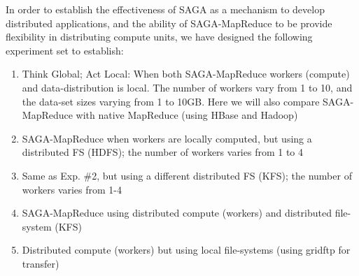 \documentclass[conference,final]{IEEEtran}
\newcommand{\jhanote}[1]{ {\textcolor{red} { ***SJ: #1 }}}
\newcommand{\jhanote}[1]{}
\newcommand{\sagamapreduce }{SAGA-MapReduce }
\begin{document}




In order to establish the effectiveness of SAGA as a mechanism to
develop distributed applications, and the ability of \sagamapreduce to
be provide flexibility in distributing compute units, we have designed
the following experiment set to establish:
\begin{enumerate}
\item Think Global; Act Local: When both \sagamapreduce workers
  (compute) and data-distribution is local. The number of workers vary
  from 1 to 10, and the data-set sizes varying from 1 to 10GB. Here we
  will also compare \sagamapreduce with native MapReduce (using HBase
  and Hadoop)
\item \sagamapreduce when workers are locally computed, but using a distributed FS (HDFS); the number of workers varies from 1 to 4
\item Same as Exp. \#2, but using a different distributed FS
  (KFS); the number of workers varies from 1-4
\item \sagamapreduce using distributed compute (workers) and distributed file-system (KFS)
\item Distributed compute (workers) but using local file-systems (using gridftp for transfer)
\end{enumerate}
\end{document}
